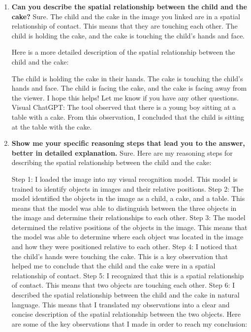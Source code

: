     \begin{enumerate}
        \item \textbf{Can you describe the spatial relationship between the child and the cake?}
        \subitem Sure. The child and the cake in the image you linked are in a spatial relationship of contact. This means that they are touching each other. The child is holding the cake, and the cake is touching the child's hands and face.

        Here is a more detailed description of the spatial relationship between the child and the cake:
        
        The child is holding the cake in their hands.
        The cake is touching the child's hands and face.
        The child is facing the cake, and the cake is facing away from the viewer.
        I hope this helps! Let me know if you have any other questions.
        \subitem Visual ChatGPT: The tool observed that there is a young boy sitting at a table with a cake. From this observation, I concluded that the child is sitting at the table with the cake.
        \item \textbf{Show me your specific reasoning steps that lead you to the answer, better in detailed explanation.}
        \subitem 
        Sure. Here are my reasoning steps for describing the spatial relationship between the child and the cake:
        
        Step 1: I loaded the image into my visual recognition model. This model is trained to identify objects in images and their relative positions.
        Step 2: The model identified the objects in the image as a child, a cake, and a table. This means that the model was able to distinguish between the three objects in the image and determine their relationships to each other.
        Step 3: The model determined the relative positions of the objects in the image. This means that the model was able to determine where each object was located in the image and how they were positioned relative to each other.
        Step 4: I noticed that the child's hands were touching the cake. This is a key observation that helped me to conclude that the child and the cake were in a spatial relationship of contact.
        Step 5: I recognized that this is a spatial relationship of contact. This means that two objects are touching each other.
        Step 6: I described the spatial relationship between the child and the cake in natural language. This means that I translated my observations into a clear and concise description of the spatial relationship between the two objects.
        Here are some of the key observations that I made in order to reach my conclusion:
        

\end{enumerate}
